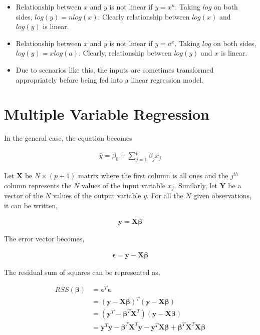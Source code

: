 \documentclass[11pt, a4paper]{article}
\begin{document}
\begin{itemize}
	\item Relationship between $x$ and $y$ is not linear if $y = x^n$. Taking $log$ on both sides, $log(y) = nlog(x)$. Clearly relationship between $log(x)$ and $log(y)$ is linear. 
	\item Relationship between $x$ and $y$ is not linear if $y = a^x$. Taking $log$ on both sides, $log(y) = xlog(a)$. Clearly, relationship between $log(y)$ and $x$ is linear.
	\item Due to scenarios like this, the inputs are sometimes transformed appropriately before being fed into a linear regression model.
\end{itemize}
 
\section{Multiple Variable Regression} 

In the general case, the equation becomes

\begin{align*}
	\hat{y} = \beta_0 + \sum\limits_{j = 1}^p \beta_j x_j 
\end{align*}

Let $\mathbf{X}$ be $N\times(p+1)$ matrix where the first column is all ones and the $j^{th}$ column represents the $N$ values of the input variable $x_j$. Similarly, let $\mathbf{Y}$ be a vector of the $N$ values of the output variable $y$. For all the $N$ given observations, it can be written,

\begin{align*}
	\mathbf{y} = \mathbf{X}\boldsymbol{\beta} 
\end{align*} 

The error vector becomes,

\begin{align*}
	\mathbf{\epsilon} = \mathbf{y} - \mathbf{X}\boldsymbol{\beta} 
\end{align*}

The residual sum of squares can be represented as,

\begin{align*}
	RSS(\boldsymbol{\beta}) & = \mathbf{\epsilon}^T\mathbf{\epsilon}                                                                                                                                          \\
	                        & = (\mathbf{y} - \mathbf{X}\boldsymbol{\beta})^T(\mathbf{y} - \mathbf{X}\boldsymbol{\beta})                                                                                      \\
	                        & = (\mathbf{y}^T - \boldsymbol{\beta}^T\mathbf{X}^T)(\mathbf{y} - \mathbf{X}\boldsymbol{\beta})                                                                                  \\
	                        & = \mathbf{y}^T\mathbf{y} - \boldsymbol{\beta}^T\mathbf{X}^T\mathbf{y} - \mathbf{y}^T\mathbf{X}\boldsymbol{\beta} + \boldsymbol{\beta}^T\mathbf{X}^T\mathbf{X}\boldsymbol{\beta} 
\end{align*}
\end{document}
